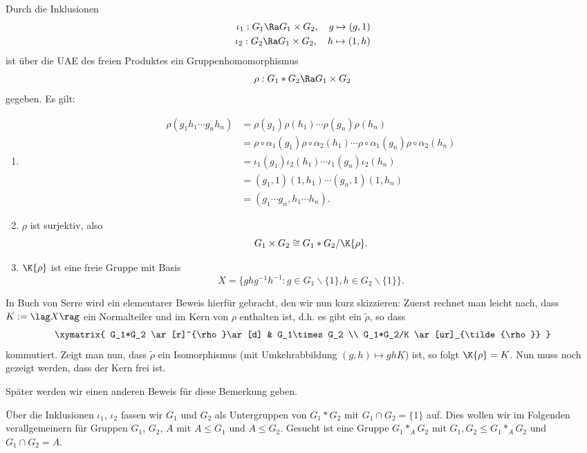 \BEM\label{bem_freiprodukt}
Durch die Inklusionen
\begin{align*}
\iota_1:G_1\Ra G_1\times G_2,\quad g\mapsto(g,1) \\
\iota_2:G_2\Ra G_1\times G_2,\quad h\mapsto(1,h)
\end{align*}
ist über die UAE des freien Produktes ein Gruppenhomomorphismus
\[
\rho:G_1*G_2\Ra G_1\times G_2
\]
gegeben. Es gilt:
\begin{enumerate}
\item
\begin{align*}
\rho(g_1 h_1\cdots g_n h_n) &=
\rho(g_1)\rho(h_1)\cdots\rho(g_n)\rho(h_n) \\
&=\rho\circ\alpha_1(g_1)\rho\circ\alpha_2(h_1)\cdots\rho\circ\alpha_1(g_n)\rho\circ\alpha_2(h_n) \\
&=\iota_1(g_1)\iota_2(h_1)\cdots\iota_1(g_n)\iota_2(h_n) \\
&=(g_1,1)(1,h_1)\cdots(g_n,1)(1,h_n) \\
&=(g_1\cdots g_n,h_1\cdots h_n).
\end{align*}
\item $\rho$ ist surjektiv, also
\[
G_1\times G_2 \cong G_1*G_2/\K{\rho}.
\]
\item $\K{\rho}$ ist eine freie Gruppe mit Basis
\[
X=\{ ghg^{-1}h^{-1}:g\in G_1\backslash\{1\},h\in G_2\backslash\{1\}\}.
\]
\end{enumerate}
In Buch von Serre \cite{serre} wird ein elementarer Beweis hierfür
gebracht, den wir nun kurz skizzieren:
Zuerst rechnet man leicht nach, dass $K:=\lag X\rag$ ein Normalteiler
und im Kern von $\rho$ enthalten ist, d.h. es gibt ein $\tilde{\rho}$,
so dass
\[\xymatrix{
G_1*G_2 \ar[r]^{\rho}\ar[d] & G_1\times G_2 \\
G_1*G_2/K \ar[ur]_{\tilde{\rho}}
}\]
kommutiert. Zeigt man nun, dass $\tilde{\rho}$ ein Isomorphismus
(mit Umkehrabbildung $(g,h)\mapsto gh K$) ist, so folgt
$\K{\rho}=K$. Nun muss noch gezeigt werden, dass der Kern frei ist.

Später werden wir einen anderen Beweis für diese Bemerkung geben.

Über die Inklusionen $\iota_1$, $\iota_2$ fassen wir $G_1$ und $G_2$
als Untergruppen von $G_1*G_2$ mit $G_1\cap G_2=\{1\}$ auf.
Dies wollen wir im Folgenden verallgemeinern für Gruppen $G_1$, $G_2$,
$A$ mit $A\leq G_1$ und $A\leq G_2$. Gesucht ist eine Gruppe
$G_1 *_A G_2$ mit $G_1, G_2 \leq G_1 *_A G_2$ und
$G_1 \cap G_2 = A$.


